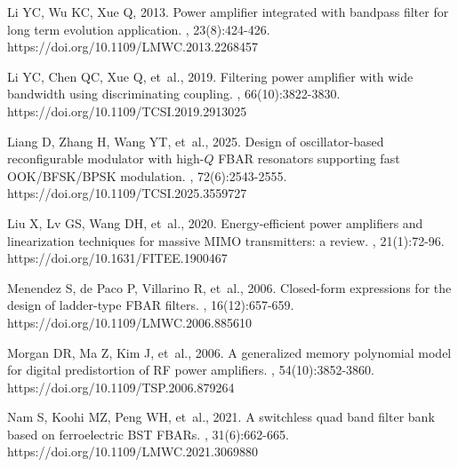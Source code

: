 \documentclass[twoside,twocolumn]{article}
\begin{document}
{{\begin{thebibliography}{}
Li YC, Wu KC, Xue Q, 2013.
\newblock Power amplifier integrated with bandpass filter for long term evolution application.
, 23(8):424-426. \\
  https://doi.org/10.1109/LMWC.2013.2268457

Li YC, Chen QC, Xue Q, {et~al.}, 2019.
\newblock Filtering power amplifier with wide bandwidth using discriminating coupling.
, 66(10):3822-3830. \\
  https://doi.org/10.1109/TCSI.2019.2913025

Liang D, Zhang H, Wang YT, {et~al.}, 2025.
\newblock Design of oscillator-based reconfigurable modulator with high-$Q$ FBAR resonators supporting fast OOK/BFSK/BPSK modulation.
, 72(6):2543-2555. \\
  https://doi.org/10.1109/TCSI.2025.3559727

Liu X, Lv GS, Wang DH, {et~al.}, 2020.
\newblock Energy-efficient power amplifiers and linearization techniques for massive MIMO transmitters: a review.
, 21(1):72-96. \\
  https://doi.org/10.1631/FITEE.1900467

Menendez S, de Paco P, Villarino R, {et~al.}, 2006.
\newblock Closed-form expressions for the design of ladder-type FBAR filters.
, 16(12):657-659. \\
  https://doi.org/10.1109/LMWC.2006.885610

Morgan DR, Ma Z, Kim J, {et~al.}, 2006.
\newblock A generalized memory polynomial model for digital predistortion of RF power amplifiers.
, 54(10):3852-3860. \\
  https://doi.org/10.1109/TSP.2006.879264

Nam S, Koohi MZ, Peng WH, {et~al.}, 2021.
\newblock A switchless quad band filter bank based on ferroelectric BST FBARs.
, 31(6):662-665. \\
  https://doi.org/10.1109/LMWC.2021.3069880


\end{thebibliography}}}
\end{document}

